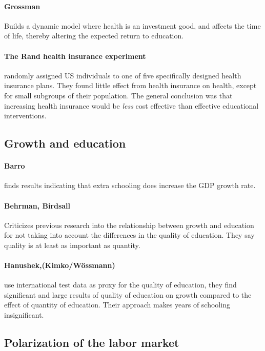 \documentclass[12pt, a4paper]{article}
\begin{document}
\begin{multicols}{2}
\paragraph{Grossman} Builds a dynamic model where health is an investment good, and affects the time of life, thereby altering the expected return to education.

\paragraph{The Rand health insurance experiment} randomly assigned US individuals to one of five specifically designed health insurance plans. They found little effect from health insurance on health, except for small subgroups of their population. The general conclusion was that increasing health insurance would be \textit{less} cost effective than effective educational interventions.

\subsection{Growth and education}

\paragraph{Barro} finds results indicating that extra schooling does increase the GDP growth rate.

\paragraph{Behrman, Birdsall} Criticizes previous research into the relationship between growth and education for not taking into account the differences in the quality of education. They say quality is at least as important as quantity.

\paragraph{Hanushek,(Kimko/Wössmann)} use international test data as proxy for the quality of education, they find significant and large results of quality of education on growth compared to the effect of quantity of education. Their approach makes years of schooling insignificant.

\subsection{Polarization of the labor market}

\end{multicols}
\end{document}
